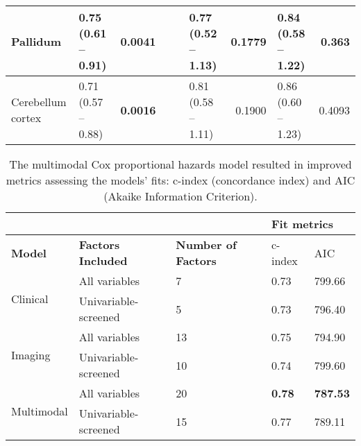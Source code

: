 \begin{sidewaystable}
{\begin{tabular}{|l|lr|lr|lr|lr|}
\hline
Pallidum & \textcolor[rgb]{0.2,0.2,0.2}{0.75 (0.61 -- 0.91)} & \textcolor[rgb]{0.2,0.2,0.2}{\textbf{0.0041}} & {\cellcolor[rgb]{0.753,0.753,0.753}} & {\cellcolor[rgb]{0.753,0.753,0.753}} & \textcolor[rgb]{0.2,0.2,0.2}{0.77 (0.52 -- 1.13)} & \textcolor[rgb]{0.2,0.2,0.2}{0.1779} & \textcolor[rgb]{0.2,0.2,0.2}{0.84 (0.58 -- 1.22)} & \textcolor[rgb]{0.2,0.2,0.2}{0.363} \\ 
\hline
Cerebellum cortex & \textcolor[rgb]{0.2,0.2,0.2}{0.71 (0.57 -- 0.88)} & \textcolor[rgb]{0.2,0.2,0.2}{\textbf{0.0016}} & {\cellcolor[rgb]{0.753,0.753,0.753}} & {\cellcolor[rgb]{0.753,0.753,0.753}} & \textcolor[rgb]{0.2,0.2,0.2}{0.81 (0.58 -- 1.11)} & \textcolor[rgb]{0.2,0.2,0.2}{0.1900}\textcolor[rgb]{0.2,0.2,0.2}{} & \textcolor[rgb]{0.2,0.2,0.2}{0.86 (0.60 -- 1.23)} & \textcolor[rgb]{0.2,0.2,0.2}{0.4093} \\
\hline
\end{tabular}
}
\end{sidewaystable}



\begin{table}
\centering
\caption[Fit metrics of the Cox proportional hazards models.]{The multimodal Cox proportional hazards model resulted in improved metrics assessing the models' fits: c-index (concordance index) and AIC (Akaike Information Criterion).}
\label{tab:coxfitmetrics}
\begin{tabular}{|l|l|l|ll|} 
\cline{4-5}
\multicolumn{1}{l}{} & \multicolumn{1}{l}{} & & \multicolumn{2}{l|}{\textbf{Fit metrics} } \\ 
\hline
\textbf{Model} & \textbf{Factors Included} & \textbf{Number of Factors} & c-index & AIC \\ 
\hline
\multirow{2}{*}{Clinical} & All variables & 7 & 0.73 & 799.66 \\ 
\cline{2-5}
 & Univariable-screened & 5 & 0.73 & 796.40 \\ 
\hline
\multirow{2}{*}{Imaging} & All variables & 13 & 0.75 & 794.90 \\ 
\cline{2-5}
 & Univariable-screened & 10 & 0.74 & 799.60 \\ 
\hline
\multirow{2}{*}{Multimodal} & All variables & 20 & \textbf{0.78} & \textbf{787.53} \\ 
\cline{2-5}
 & Univariable-screened & 15 & 0.77 & 789.11 \\
\hline
\end{tabular}
\end{table}